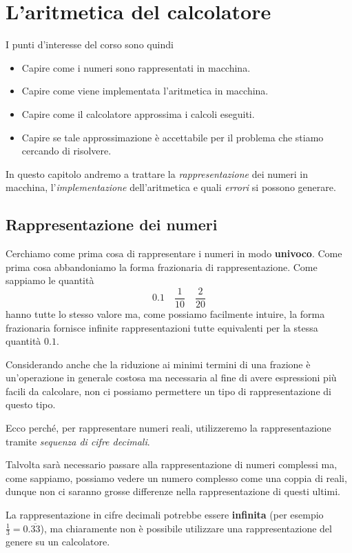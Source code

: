 \chapter{L'aritmetica del calcolatore}
I punti d'interesse del corso sono quindi
\begin{itemize}
	\item Capire come i numeri sono rappresentati in macchina.
	\item Capire come viene implementata l'aritmetica in macchina.
	\item Capire come il calcolatore approssima i calcoli eseguiti.
	\item Capire se tale approssimazione è accettabile per il problema che stiamo cercando di risolvere.
\end{itemize}
In questo capitolo andremo a trattare la \emph{rappresentazione} dei numeri in macchina, l'\emph{implementazione}
dell'aritmetica e quali \emph{errori} si possono generare.

\section{Rappresentazione dei numeri}
Cerchiamo come prima cosa di rappresentare i numeri in modo \textbf{univoco}. Come prima cosa abbandoniamo la
forma frazionaria di rappresentazione. Come sappiamo le quantità
\[ 0.1 \quad \frac{1}{10} \quad \frac{2}{20} \]
hanno tutte lo stesso valore ma, come possiamo facilmente intuire, la forma frazionaria fornisce infinite
rappresentazioni tutte equivalenti per la stessa quantità $0.1$.

Considerando anche che la riduzione ai minimi termini di una frazione è un'operazione in generale costosa ma
necessaria al fine di avere espressioni più facili da calcolare, non ci possiamo permettere un tipo di
rappresentazione di questo tipo.

Ecco perché, per rappresentare numeri reali, utilizzeremo la rappresentazione tramite \emph{sequenza di cifre
	decimali}.

\begin{observation}
	Talvolta sarà necessario passare alla rappresentazione di numeri complessi ma, come sappiamo, possiamo vedere
	un numero complesso come una coppia di reali, dunque non ci saranno grosse differenze nella rappresentazione
	di questi ultimi.
\end{observation}

\begin{observation}
	La rappresentazione in cifre decimali potrebbe essere \textbf{infinita} (per esempio
	$\frac{1}{3} = 0.\overline{33}$), ma chiaramente non è possibile utilizzare una rappresentazione del genere
	su un calcolatore.
\end{observation}

